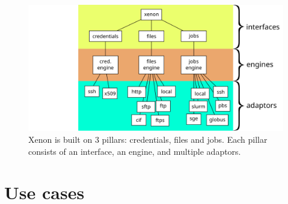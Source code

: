 \documentclass[12pt, a4paper, twoside, openany, titlepage]{book}
\begin{document}
\begin{figure}[ht]
\centering
\includegraphics[width=1.0\columnwidth]{images/xenon-design}
\caption{\label{fig:xenon-design} Xenon is built on 3 pillars: credentials, files and jobs. Each pillar consists of an interface, an engine, and multiple adaptors.}
\end{figure}


\section{Use cases}
\end{document}
